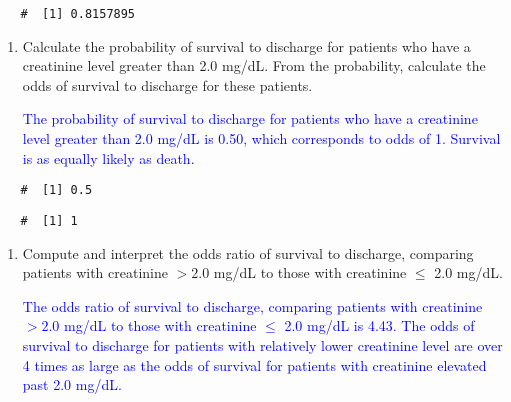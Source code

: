\documentclass[letterpaper,12pt,twoside,]{pinp}
\begin{document}
\begin{enumerate}
  \begin{ShadedResult}
   \begin{verbatim}
   #  [1] 0.8157895
   \end{verbatim}
   \end{ShadedResult}

  \begin{enumerate}
  \def\labelenumii{\alph{enumii})}
  \setcounter{enumii}{1}
  \item
    Calculate the probability of survival to discharge for patients who
    have a creatinine level greater than 2.0 mg/dL. From the
    probability, calculate the odds of survival to discharge for these
    patients.

    \textcolor{blue}{The probability of survival to discharge for patients who have a creatinine level greater than 2.0 mg/dL is 0.50, which corresponds to odds of 1. Survival is as equally likely as death.}
  \end{enumerate}

\begin{Shaded}
\begin{Highlighting}[]
\OtherTok{=} \SpecialCharTok{/}
\end{Highlighting}
\end{Shaded}

  \begin{ShadedResult}
   \begin{verbatim}
   #  [1] 0.5
   \end{verbatim}
   \end{ShadedResult}

\begin{Shaded}
\begin{Highlighting}[]
\OtherTok{=}\SpecialCharTok{/}\NormalTok{(} \SpecialCharTok{{-}}
\end{Highlighting}
\end{Shaded}

  \begin{ShadedResult}
   \begin{verbatim}
   #  [1] 1
   \end{verbatim}
   \end{ShadedResult}

  \begin{enumerate}
  \def\labelenumii{\alph{enumii})}
  \setcounter{enumii}{2}
  \item
    Compute and interpret the odds ratio of survival to discharge,
    comparing patients with creatinine \(> 2.0\) mg/dL to those with
    creatinine \(\leq\) 2.0 mg/dL.

    \textcolor{blue}{The odds ratio of survival to discharge, comparing patients with creatinine $> 2.0$ mg/dL to those with creatinine $\leq$ 2.0 mg/dL is 4.43. The odds of survival to discharge for patients with relatively lower creatinine level are over 4 times as large as the odds of survival for patients with creatinine elevated past 2.0 mg/dL.}
  \end{enumerate}
\end{enumerate}
\end{document}
